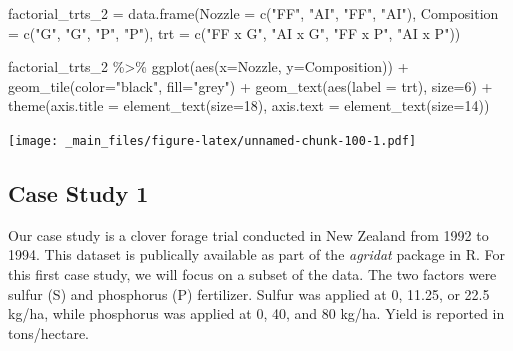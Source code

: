 \documentclass[
]{book}
\newenvironment{Shaded}{\begin{snugshade}}{\end{snugshade}}
\newcommand{\AttributeTok}[1]{\textcolor[rgb]{0.77,0.63,0.00}{#1}}
\newcommand{\DecValTok}[1]{\textcolor[rgb]{0.00,0.00,0.81}{#1}}
\newcommand{\FunctionTok}[1]{\textcolor[rgb]{0.00,0.00,0.00}{#1}}
\newcommand{\NormalTok}[1]{#1}
\newcommand{\OtherTok}[1]{\textcolor[rgb]{0.56,0.35,0.01}{#1}}
\newcommand{\SpecialCharTok}[1]{\textcolor[rgb]{0.00,0.00,0.00}{#1}}
\newcommand{\StringTok}[1]{\textcolor[rgb]{0.31,0.60,0.02}{#1}}
\begin{document}
\begin{Shaded}
\begin{Highlighting}[]
\NormalTok{factorial\_trts\_2 }\OtherTok{=} \FunctionTok{data.frame}\NormalTok{(}\AttributeTok{Nozzle =} \FunctionTok{c}\NormalTok{(}\StringTok{"FF"}\NormalTok{, }\StringTok{"AI"}\NormalTok{, }\StringTok{"FF"}\NormalTok{, }\StringTok{"AI"}\NormalTok{),}
                              \AttributeTok{Composition =} \FunctionTok{c}\NormalTok{(}\StringTok{"G"}\NormalTok{, }\StringTok{"G"}\NormalTok{, }\StringTok{"P"}\NormalTok{, }\StringTok{"P"}\NormalTok{),}
                              \AttributeTok{trt =} \FunctionTok{c}\NormalTok{(}\StringTok{"FF x G"}\NormalTok{,  }\StringTok{"AI x G"}\NormalTok{, }\StringTok{"FF x P"}\NormalTok{, }\StringTok{"AI x P"}\NormalTok{))}

\NormalTok{factorial\_trts\_2 }\SpecialCharTok{\%\textgreater{}\%}
  \FunctionTok{ggplot}\NormalTok{(}\FunctionTok{aes}\NormalTok{(}\AttributeTok{x=}\NormalTok{Nozzle, }\AttributeTok{y=}\NormalTok{Composition)) }\SpecialCharTok{+}
  \FunctionTok{geom\_tile}\NormalTok{(}\AttributeTok{color=}\StringTok{"black"}\NormalTok{, }\AttributeTok{fill=}\StringTok{"grey"}\NormalTok{) }\SpecialCharTok{+}
  \FunctionTok{geom\_text}\NormalTok{(}\FunctionTok{aes}\NormalTok{(}\AttributeTok{label =}\NormalTok{ trt), }\AttributeTok{size=}\DecValTok{6}\NormalTok{) }\SpecialCharTok{+}
  \FunctionTok{theme}\NormalTok{(}\AttributeTok{axis.title =} \FunctionTok{element\_text}\NormalTok{(}\AttributeTok{size=}\DecValTok{18}\NormalTok{),}
        \AttributeTok{axis.text =} \FunctionTok{element\_text}\NormalTok{(}\AttributeTok{size=}\DecValTok{14}\NormalTok{))}
\end{Highlighting}
\end{Shaded}

\texttt{[image: \_main\_files/figure-latex/unnamed-chunk-100-1.pdf]}

\hypertarget{case-study-1-1}{%
\subsection{Case Study 1}\label{case-study-1-1}}

Our case study is a clover forage trial conducted in New Zealand from 1992 to 1994. This dataset is publically available as part of the \emph{agridat} package in R. For this first case study, we will focus on a subset of the data. The two factors were sulfur (S) and phosphorus (P) fertilizer. Sulfur was applied at 0, 11.25, or 22.5 kg/ha, while phosphorus was applied at 0, 40, and 80 kg/ha. Yield is reported in tons/hectare.
\end{document}
